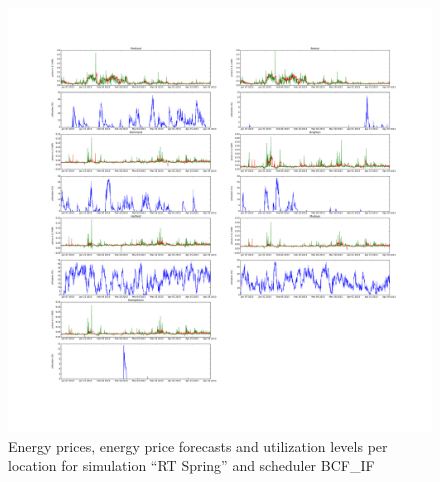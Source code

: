 \begin{figure}[htbp]
	\centering
	\vspace*{-0.6in}
	\hspace*{-1.9in}
		\includegraphics[width=1.60\textwidth]{figures/appendix_simulation_results/RT_Spring_scenario_4.pdf}
	\vspace*{-1.0in}
	\caption{Energy prices, energy price forecasts and utilization levels per location for simulation ``RT Spring'' and scheduler BCF\_IF}
	\label{fig:app_RT_Spring_scenario_4}
\end{figure}

